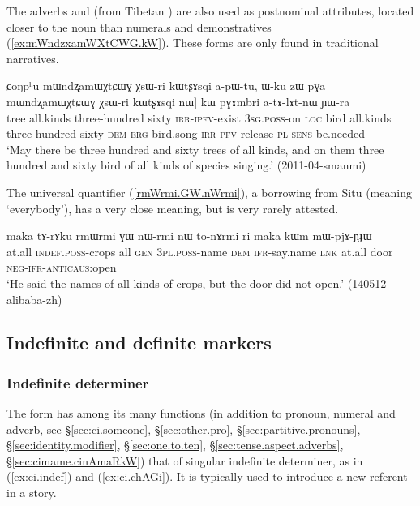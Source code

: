 The adverbs  and  (from Tibetan  ) are also used as postnominal attributes, located closer to the noun than numerals and demonstratives (\ref{ex:mWndzxamWXtCWG.kW}). These forms are only found in traditional narratives.
 
\begin{exe}
\ex \label{ex:mWndzxamWXtCWG.kW}
\gll  ɕoŋpʰu mɯndʐamɯχtɕɯɣ χsɯ-ri kɯtʂɤsqi a-pɯ-tu, ɯ-ku zɯ pɣa mɯndʐamɯχtɕɯɣ χsɯ-ri kɯtʂɤsqi nɯ] kɯ pɣɤmbri a-tɤ-lɤt-nɯ ɲɯ-ra \\
tree all.kinds three-hundred sixty \textsc{irr}-\textsc{ipfv}-exist \textsc{3sg}.\textsc{poss}-on \textsc{loc} bird all.kinds three-hundred sixty \textsc{dem} \textsc{erg} bird.song \textsc{irr}-\textsc{pfv}-release-\textsc{pl} \textsc{sens}-be.needed \\
\glt `May there be three hundred and sixty trees of all kinds, and on them three hundred and sixty bird of all kinds of species singing.' (2011-04-smanmi)
\end{exe}

The universal quantifier  (\ref{rmWrmi.GW.nWrmi}), a borrowing from Situ (meaning `everybody'), has a very close meaning, but is very rarely attested.
  
\begin{exe}
\ex \label{rmWrmi.GW.nWrmi}
\gll  maka tɤ-rɤku rmɯrmi ɣɯ nɯ-rmi nɯ to-nɤrmi ri maka kɯm mɯ-pjɤ-ɲɟɯ   \\
at.all \textsc{indef}.\textsc{poss}-crops all \textsc{gen} \textsc{3pl}.\textsc{poss}-name \textsc{dem} \textsc{ifr}-say.name \textsc{lnk} at.all door \textsc{neg}-\textsc{ifr}-\textsc{anticaus}:open \\
\glt `He said the names of all kinds of crops, but the door did not open.' (140512 alibaba-zh)
\end{exe}  

\subsection{Indefinite and definite markers} \label{sec:indefinite.markers}

\subsubsection{Indefinite determiner} \label{sec:indef.article}
The form  has among its many functions (in addition to pronoun, numeral and adverb, see §\ref{sec:ci.someone}, §\ref{sec:other.pro}, §\ref{sec:partitive.pronouns}, §\ref{sec:identity.modifier}, §\ref{sec:one.to.ten}, §\ref{sec:tense.aspect.adverbs}, §\ref{sec:cimame.cinAmaRkW}) that of singular indefinite determiner, as in (\ref{ex:ci.indef}) and (\ref{ex:ci.chAGi}). It is typically used to introduce a new referent in a story.

